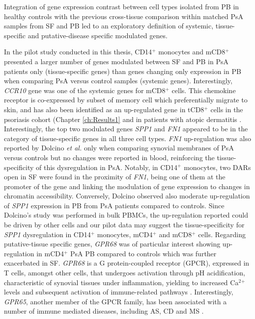 Integration of gene expression contrast between cell types isolated from PB in healthy controls with the previous cross-tissue comparison within matched PsA samples from SF and PB led to an exploratory definition of systemic, tissue-specific and putative-disease specific modulated genes. 

In the pilot study conducted in this thesis, CD14$^+$ monocytes and mCD8$^+$ presented a larger number of genes modulated between SF and PB in PsA patients only (tissue-specific genes) than genes changing only expression in PB when comparing PsA versus control samples (systemic genes). Interestingly, \textit{CCR10} gene was one of the systemic genes for mCD8$^+$ cells. This chemokine receptor is co-expressed by subset of memory cell which preferentially migrate to skin, and has also been identified as an up-regulated gene in tCD8$^+$ cells in the psoriasis cohort (Chapter \ref{ch:Results1} and in patients with atopic dermatitis \parencite{Hijnen2005}. Interestingly, the top two modulated genes \textit{SPP1} and \textit{FN1} appeared to be in the category of tissue-specific genes in all three cell types. \textit{FN1} up-regulation was also reported by Dolcino \textit{et al.} only when comparing synovial membranes of PsA versus controls but no changes were reported in blood, reinforcing the tissue-specificity of this dysregulation in PsA. Notably, in CD14$^+$ monocytes, two DARs open in SF were found in the proximity of \textit{FN1}, being one of them at the promoter of the gene and linking the modulation of gene expression to changes in chromatin accessibility. Conversely, Dolcino observed also moderate up-regulation of \textit{SPP1} expression in PB from PsA patients compared to controls. Since Dolcino's study was performed in bulk PBMCs, the up-regulation reported could be driven by other cells and our pilot data may suggest the tissue-specificity for \textit{SPP1} dysregulation in CD14$^+$ monocytes, mCD4$^+$ and mCD8$^+$ cells. Regarding putative-tissue specific genes, \textit{GPR68} was of particular interest showing up-regulation in mCD4$^+$ PsA PB compared to controls which was further exacerbated in SF. \textit{GPR68} is a G protein-coupled receptor (GPCR), expressed in T cells, amongst other cells, that undergoes activation through pH acidification, characteristic of synovial tissues under inflammation, yielding to increased Ca$^2$$^+$ levels and subsequent activation of immune-related pathways \parencite{Biniecka2016, Saxena2011}. Interestingly, \textit{GPR65}, another member of the GPCR family, has been associated with a number of immune mediated diseases, including AS, CD and MS \parencite{Cortes2013,Lassen2016,Wirasinha2018}.


